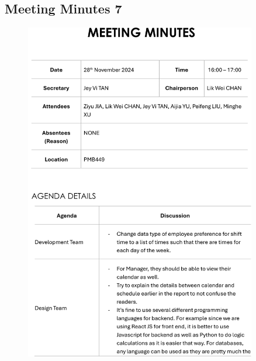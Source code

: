 \documentclass[a4paper,12pt, oneside]{report}
\begin{document}
\begin{appendices}
\section{Meeting Minutes 7}
\begin{figure}[H]
    \centering
    \includegraphics[width=0.9\textwidth]{Minutes/Minutes_7-cropped-1.png}
\end{figure}
\newpage
\begin{figure}[H]
    \centering

\end{figure}
\end{appendices}
\end{document}

